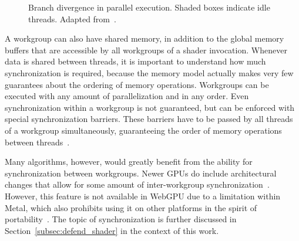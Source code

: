 \begin{figure}[ht]
\centering
{}
\caption{Branch divergence in parallel execution.
    Shaded boxes indicate idle threads. Adapted from~\cite{Hijma2023}.
}\label{fig:branching}
\end{figure}

A workgroup can also have shared memory,
in addition to the global memory buffers that are accessible by all workgroups
of a shader invocation.
Whenever data is shared between threads,
it is important to understand how much synchronization is required,
because the memory model actually makes very few guarantees about the ordering
of memory operations.
Workgroups can be executed with any amount of parallelization and in any order.
Even synchronization within a workgroup is not guaranteed,
but can be enforced with special synchronization barriers.
These barriers have to be passed by all threads of a workgroup simultaneously,
guaranteeing the order of memory operations between threads~\cite{wgsl_spec}.

Many algorithms, however, would greatly benefit from the ability for
synchronization between workgroups.
Newer GPUs do include architectural changes that allow for some amount of
inter-workgroup synchronization~\cite{Hijma2023}.
However, this feature is not available in WebGPU due to a limitation within
Metal, which also prohibits using it on other platforms in the spirit of
portability~\cite{Levien2021}.
The topic of synchronization is further discussed in
Section~\ref{subsec:defend_shader} in the context of this work.
